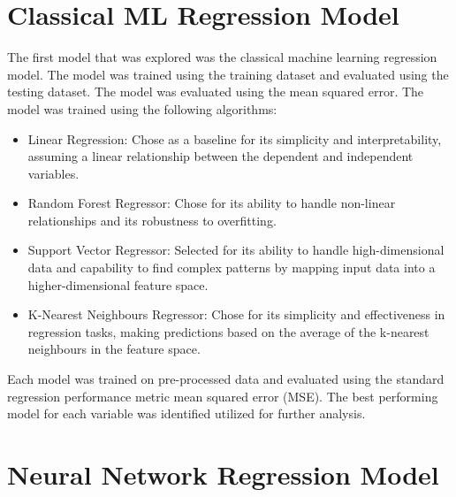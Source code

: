 \section{Classical ML Regression Model}
The first model that was explored was the classical machine learning regression model. The model was trained using the training dataset and evaluated using the testing dataset. 
The model was evaluated using the mean squared error. The model was trained using the following algorithms:

\begin{itemize}
    \item Linear Regression: Chose as a baseline for its simplicity and interpretability, assuming a linear relationship between the dependent and independent variables.
    \item Random Forest Regressor: Chose for its ability to handle non-linear relationships and its robustness to overfitting. 
    \item Support Vector Regressor: Selected for its ability to handle high-dimensional data and capability to find complex patterns by mapping input data into a higher-dimensional feature space.
    \item K-Nearest Neighbours Regressor: Chose for its simplicity and effectiveness in regression tasks, making predictions based on the average of the k-nearest neighbours in the feature space.
\end{itemize}

Each model was trained on pre-processed data and evaluated using the standard regression performance metric mean squared error (MSE). The best performing model for each variable was 
identified utilized for further analysis.




\section{Neural Network Regression Model}



